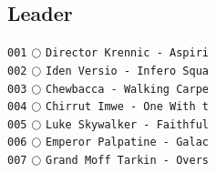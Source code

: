 \documentclass[a4paper,landscape]{article}
\begin{document}
\fontsize{8}{8}\selectfont

\begin{multicols*}{5}
    \section{Leader} 
\vspace{-2mm} 
\texttt{001} \(\bigcirc\)  \texttt{Director Krennic - Aspiri} \vspace{-0.3mm}\\ 
\texttt{002} \(\bigcirc\)  \texttt{Iden Versio - Infero Squa} \vspace{-0.3mm}\\ 
\texttt{003} \(\bigcirc\)  \texttt{Chewbacca - Walking Carpe} \vspace{-0.3mm}\\ 
\texttt{004} \(\bigcirc\)  \texttt{Chirrut Imwe - One With t} \vspace{-0.3mm}\\ 
\texttt{005} \(\bigcirc\)  \texttt{Luke Skywalker - Faithful} \vspace{-0.3mm}\\ 
\texttt{006} \(\bigcirc\)  \texttt{Emperor Palpatine - Galac} \vspace{-0.3mm}\\ 
\texttt{007} \(\bigcirc\)  \texttt{Grand Moff Tarkin - Overs} \vspace{-0.3mm}\\ 

\end{multicols*}
\end{document}
